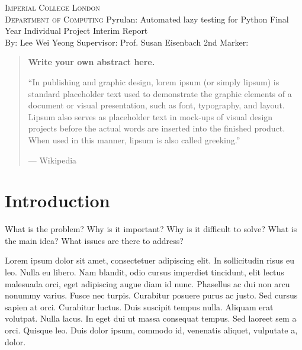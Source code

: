 \documentclass{icldt}
\def \supervisor {Prof. Susan Eisenbach}
\def \secondmarker {}
\begin{document}
\begin{titlepage}
\begin{center}
\textsc{\Large Imperial College London\\Department of Computing}
\vfil
{\huge Pyrulan:}\linebreak \linebreak
{\huge Automated lazy testing for Python}
\vfil
{\Large Final Year Individual Project}\linebreak \linebreak
{\Large Interim Report}\\[1cm]
{\large By: Lee Wei Yeong }
\vfil
{\Large Supervisor: \supervisor} \linebreak \linebreak
{\Large 2nd Marker: \secondmarker}
\vfil
{\large \monthname\ \number\year}
\end{center}
\end{titlepage}

\begin{abstract}
\textbf{Write your own abstract here.}

``In publishing and graphic design, lorem ipsum (or simply lipsum) is standard
placeholder text used to demonstrate the graphic elements of a document or
visual presentation, such as font, typography, and layout. Lipsum also serves as
placeholder text in mock-ups of visual design projects before the actual words
are inserted into the finished product. When used in this manner, lipsum is also
called greeking.''

\hfill --- Wikipedia
\end{abstract}

\tableofcontents

\chapter{Introduction}

What is the problem? Why is it important? Why is it difficult to solve? What is the main idea? What issues are there to address?

Lorem ipsum dolor sit amet, consectetuer adipiscing elit. In sollicitudin risus
eu leo. Nulla eu libero. Nam blandit, odio cursus imperdiet tincidunt, elit
lectus malesuada orci, eget adipiscing augue diam id nunc. Phasellus ac dui non
arcu nonummy varius. Fusce nec turpis. Curabitur posuere purus ac justo. Sed
cursus sapien at orci. Curabitur luctus. Duis suscipit tempus nulla. Aliquam
erat volutpat. Nulla lacus. In eget dui ut massa consequat tempus. Sed laoreet
sem a orci. Quisque leo. Duis dolor ipsum, commodo id, venenatis aliquet,
vulputate a, dolor.
\end{document}
